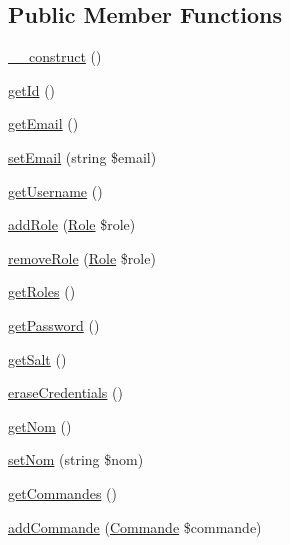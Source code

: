 \subsection*{Public Member Functions}
\begin{DoxyCompactItemize}
\item 
\mbox{\hyperlink{class_app_1_1_entity_1_1_users_a095c5d389db211932136b53f25f39685}{\+\_\+\+\_\+construct}} ()
\item 
\mbox{\hyperlink{class_app_1_1_entity_1_1_users_a12251d0c022e9e21c137a105ff683f13}{get\+Id}} ()
\item 
\mbox{\hyperlink{class_app_1_1_entity_1_1_users_a02a01849f28e2535e888ae4ec87b20f2}{get\+Email}} ()
\item 
\mbox{\hyperlink{class_app_1_1_entity_1_1_users_a2d22391fa86fa0eaf3b9d2a3c29880bc}{set\+Email}} (string \$email)
\item 
\mbox{\hyperlink{class_app_1_1_entity_1_1_users_a81b37a3c9d639574e394f80c1138c75e}{get\+Username}} ()
\item 
\mbox{\hyperlink{class_app_1_1_entity_1_1_users_a499316b2a4d41cd073ad9ac7ece47b3a}{add\+Role}} (\mbox{\hyperlink{class_app_1_1_entity_1_1_role}{Role}} \$role)
\item 
\mbox{\hyperlink{class_app_1_1_entity_1_1_users_af336604c8c29aedc9c573c8499bce742}{remove\+Role}} (\mbox{\hyperlink{class_app_1_1_entity_1_1_role}{Role}} \$role)
\item 
\mbox{\hyperlink{class_app_1_1_entity_1_1_users_aa676cae5ee8d7fb6862a8724adc2660d}{get\+Roles}} ()
\item 
\mbox{\hyperlink{class_app_1_1_entity_1_1_users_a04e0957baeb7acde9c0c86556da2d43f}{get\+Password}} ()
\item 
\mbox{\hyperlink{class_app_1_1_entity_1_1_users_a1dfe56d2c965d451a135f3f3910a8b8d}{get\+Salt}} ()
\item 
\mbox{\hyperlink{class_app_1_1_entity_1_1_users_ac565b8c00fe93ce673f8237849f072a6}{erase\+Credentials}} ()
\item 
\mbox{\hyperlink{class_app_1_1_entity_1_1_users_a184f2299ee4553fa0782ea87c9aed362}{get\+Nom}} ()
\item 
\mbox{\hyperlink{class_app_1_1_entity_1_1_users_ad9079562ce21dfd57a8fb9cfe1e8f8ba}{set\+Nom}} (string \$nom)
\item 
\mbox{\hyperlink{class_app_1_1_entity_1_1_users_a0fb99b0610e269ca6409dd3a767ad8bf}{get\+Commandes}} ()
\item 
\mbox{\hyperlink{class_app_1_1_entity_1_1_users_a2872312b16486646f997c6c8fd579cca}{add\+Commande}} (\mbox{\hyperlink{class_app_1_1_entity_1_1_commande}{Commande}} \$commande)

\end{DoxyCompactItemize}

